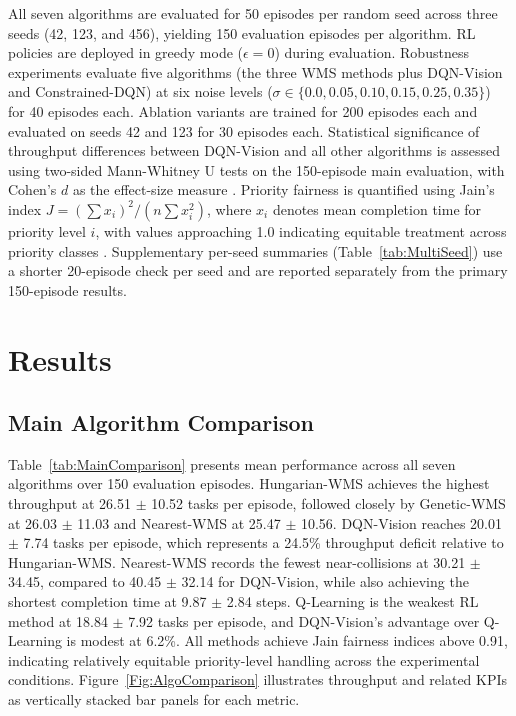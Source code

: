 \documentclass[conference]{IEEEtran}
\begin{document}
All seven algorithms are evaluated for 50 episodes per random seed across three seeds (42, 123, and 456), yielding 150 evaluation episodes per algorithm.
RL policies are deployed in greedy mode ($\epsilon = 0$) during evaluation.
Robustness experiments evaluate five algorithms (the three WMS methods plus DQN-Vision and Constrained-DQN) at six noise levels ($\sigma \in \{0.0, 0.05, 0.10, 0.15, 0.25, 0.35\}$) for 40 episodes each.
Ablation variants are trained for 200 episodes each and evaluated on seeds 42 and 123 for 30 episodes each.
Statistical significance of throughput differences between DQN-Vision and all other algorithms is assessed using two-sided Mann-Whitney U tests on the 150-episode main evaluation, with Cohen's $d$ as the effect-size measure \cite{mann1947test}.
Priority fairness is quantified using Jain's index $J = (\sum x_i)^2 / (n \sum x_i^2)$, where $x_i$ denotes mean completion time for priority level $i$, with values approaching 1.0 indicating equitable treatment across priority classes \cite{jain1984quantitative}.
Supplementary per-seed summaries (Table~\ref{tab:MultiSeed}) use a shorter 20-episode check per seed and are reported separately from the primary 150-episode results.


\section{Results}

\subsection{Main Algorithm Comparison}

Table~\ref{tab:MainComparison} presents mean performance across all seven algorithms over 150 evaluation episodes.
Hungarian-WMS achieves the highest throughput at 26.51 $\pm$ 10.52 tasks per episode, followed closely by Genetic-WMS at 26.03 $\pm$ 11.03 and Nearest-WMS at 25.47 $\pm$ 10.56.
DQN-Vision reaches 20.01 $\pm$ 7.74 tasks per episode, which represents a 24.5\% throughput deficit relative to Hungarian-WMS.
Nearest-WMS records the fewest near-collisions at 30.21 $\pm$ 34.45, compared to 40.45 $\pm$ 32.14 for DQN-Vision, while also achieving the shortest completion time at 9.87 $\pm$ 2.84 steps.
Q-Learning is the weakest RL method at 18.84 $\pm$ 7.92 tasks per episode, and DQN-Vision's advantage over Q-Learning is modest at 6.2\%.
All methods achieve Jain fairness indices above 0.91, indicating relatively equitable priority-level handling across the experimental conditions.
Figure~\ref{Fig:AlgoComparison} illustrates throughput and related KPIs as vertically stacked bar panels for each metric.
\end{document}
